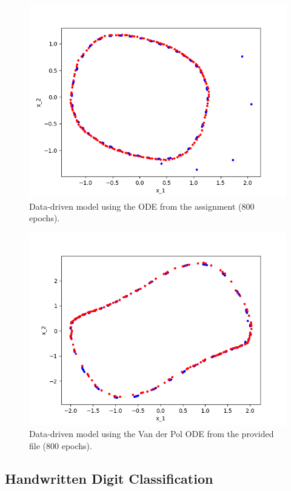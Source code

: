 \documentclass{article}
\begin{document}
\begin{figure}[h!]
    \centering
    \includegraphics[scale=0.4]{figs/Vander_Test01.png}
    \caption{Data-driven model using the ODE from the assignment (800 epochs).}
\end{figure}

\begin{figure}[h!]
    \centering
    \includegraphics[scale=0.4]{figs/Vander_Test02.png}
    \caption{Data-driven model using the Van der Pol ODE from the provided file (800 epochs).}
\end{figure}

\subsection{Handwritten Digit Classification}
\end{document}

